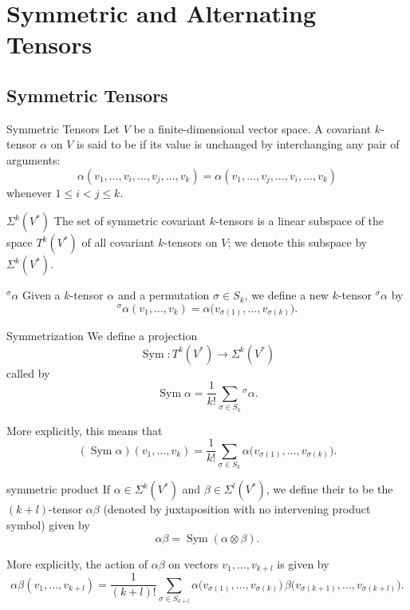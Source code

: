\documentclass[../main.tex]{subfiles}
\begin{document}
\section{Symmetric and Alternating Tensors}

\subsection*{Symmetric Tensors}

\begin{definition}{Symmetric Tensors}{}
    Let \(V\) be a finite-dimensional vector space. A covariant \(k\)-tensor \(\alpha\) on \(V\) is said to be  if its value is unchanged by interchanging any pair of arguments:
\[
\alpha(v_1,\ldots,v_i,\ldots,v_j,\ldots,v_k)
=
\alpha(v_1,\ldots,v_j,\ldots,v_i,\ldots,v_k)
\]
whenever \(1 \le i < j \le k\).
\end{definition}

\begin{definition}{\(\Sigma^{k}(V^{*})\)}{}
    The set of symmetric covariant \(k\)-tensors is a linear subspace of the space \(T^{k}(V^{*})\) of all covariant \(k\)-tensors on \(V\); we denote this subspace by \(\Sigma^{k}(V^{*})\).
\end{definition}

\begin{definition}{\(  {}^ \sigma  \alpha  \) }{}
  Given a \(k\)-tensor \(\alpha\) and a permutation \(\sigma \in S_k\), we define a new \(k\)-tensor \({}^ \sigma  \alpha\) by
\[
{}^ \sigma  \alpha (v_1,\ldots,v_k)=\alpha\bigl(v_{\sigma(1)},\ldots,v_{\sigma(k)}\bigr).
\]
\end{definition}
\begin{definition}{Symmetrization}{}
 We define a projection
\[
\operatorname{Sym}\colon T^{k}(V^{*}) \to \Sigma^{k}(V^{*})
\]
called  by
\[
\operatorname{Sym}\alpha = \frac{1}{k!} \sum_{\sigma \in S_{k}} {}^ \sigma  \alpha .
\]

More explicitly, this means that
\[
(\operatorname{Sym}\alpha)(v_{1},\dots,v_{k})
= \frac{1}{k!} \sum_{\sigma \in S_{k}} \alpha\bigl(v_{\sigma(1)},\dots,v_{\sigma(k)}\bigr) .
\]
\end{definition}

\begin{definition}{symmetric product}{}
     If \(\alpha \in \Sigma^{k}(V^{*})\) and \(\beta \in \Sigma^{l}(V^{*})\), we define their  to be the \((k+l)\)-tensor \(\alpha\beta\) (denoted by juxtaposition with no intervening product symbol) given by
\[
\alpha\beta = \operatorname{Sym}(\alpha \otimes \beta).
\]

More explicitly, the action of \(\alpha\beta\) on vectors \(v_{1},\ldots,v_{k+l}\) is given by
\[
\alpha\beta(v_{1},\ldots,v_{k+l})
= \frac{1}{(k+l)!} \sum_{\sigma \in S_{k+l}}
\alpha\bigl(v_{\sigma(1)},\ldots,v_{\sigma(k)}\bigr)\,
\beta\bigl(v_{\sigma(k+1)},\ldots,v_{\sigma(k+l)}\bigr).
\]
\end{definition}
\end{document}
